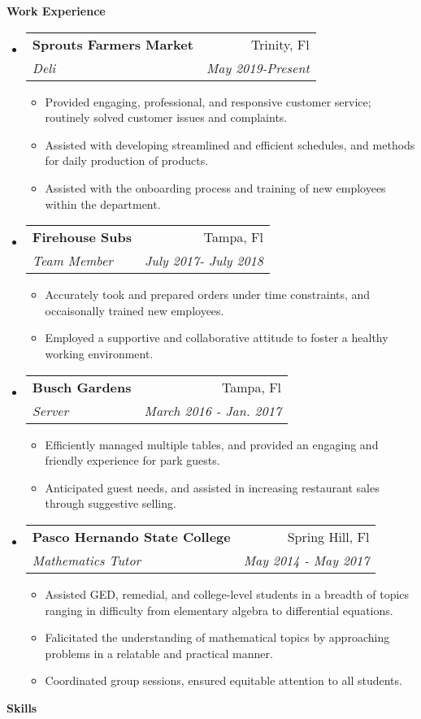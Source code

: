 \documentclass[letterpaper, 10pt]{article}
\makeatletter
\newcommand{\resitem}[1]{\item #1 \vspace{-2pt}}
\newcommand{\resheading}[1]{{\large \colorbox{mywhite}{\begin{minipage}{\dimexpr\textwidth-2\fboxsep}
    {\textbf{#1 \vphantom{p\^{E}}}}\end{minipage}}}}
\newcommand{\ressubheading}[4]{
    \begin{tabular*}{\linewidth}{l@{\extracolsep{\fill}}r}
        \textbf{#1} & #2 \\
        \textit{#3} & \textit{#4} \\
    \end{tabular*}\vspace{-6pt}
}
\makeatother
\begin{document}
\resheading{Work Experience}
\begin{itemize}
\item
    \ressubheading{Sprouts Farmers Market}{Trinity, Fl}{Deli}{May 2019-Present}
    \begin{itemize}
        \resitem{Provided engaging, professional, and responsive customer service; routinely
            solved customer issues and complaints.}
        \resitem{Assisted with developing streamlined and efficient schedules, and methods 
            for daily production of products.}
            \resitem{Assisted with the onboarding process and training of new employees within 
            the department.}
    \end{itemize}

\item
    \ressubheading{Firehouse Subs}{Tampa, Fl}{Team Member}{July 2017- July 2018}
    \begin{itemize}
        \resitem{Accurately took and prepared orders under time constraints, and occaisonally
        trained new employees.}
        \resitem{Employed a supportive and collaborative attitude to foster a healthy working environment.}
    \end{itemize}
\item 
    \ressubheading{Busch Gardens}{Tampa, Fl}{Server}{March 2016 - Jan. 2017}
    \begin{itemize}
        \resitem{Efficiently managed multiple tables, and provided an engaging and friendly 
            experience for park guests.} 
        \resitem{Anticipated guest needs, and assisted in increasing restaurant sales through
            suggestive selling.}
    \end{itemize}
\item
    \ressubheading{Pasco Hernando State College}{Spring Hill, Fl}{Mathematics Tutor}{May 2014 - May 2017}
    \begin{itemize}
        \resitem{Assisted GED, remedial, and college-level students in a breadth of topics ranging in difficulty from elementary algebra to differential equations.}
        \resitem{Falicitated the understanding of mathematical topics by approaching problems in a relatable and practical manner.}
        \resitem{Coordinated group sessions, ensured equitable attention to all students.}
    \end{itemize}
\end{itemize}
\resheading{Skills}
    
\end{document}
